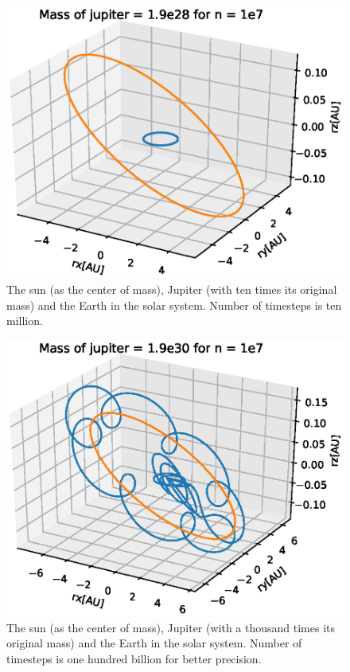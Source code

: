 \documentclass{article}
\begin{document}
\begin{figure}[H]
  \includegraphics[scale=0.5]{plots/Mass10.eps}
  \caption{The sun (as the center of mass), Jupiter (with ten times its original mass) and the Earth in the solar system. Number of timesteps is ten million.}
  \label{jupitermass10}
\end{figure}

\begin{figure}[H]
  \includegraphics[scale=0.6]{plots/Mass1000.eps}
  \caption{The sun (as the center of mass), Jupiter (with a thousand times its original mass) and the Earth in the solar system. Number of timesteps is one hundred billion for better precision.}
  \label{jupitermass1000}
\end{figure}
\end{document}
